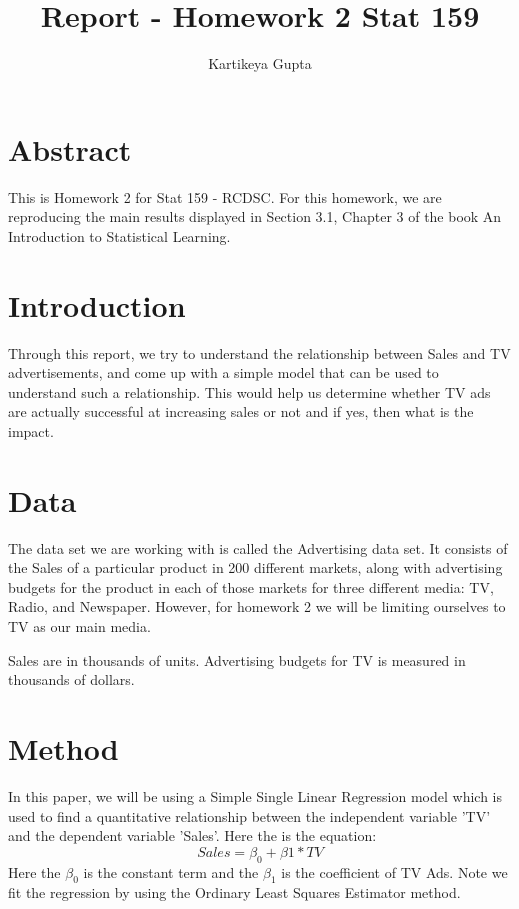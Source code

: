 \documentclass{article}
\begin{document}

\title{Report - Homework 2 Stat 159}
\author{Kartikeya Gupta}
\maketitle

\section{Abstract}
This is Homework 2 for Stat 159 - RCDSC. For this homework, we are reproducing the main results displayed in Section 3.1, Chapter 3 of the book An Introduction to Statistical Learning.  


\section{Introduction}
Through this report, we try to understand the relationship between Sales and TV advertisements, and come up with a simple model that can be used to understand such a relationship. This would help us determine whether TV ads are actually successful at increasing sales or not and if yes, then what is the impact. 


\section{Data}
The data set we are working with is called the Advertising data set. It consists of the Sales of a particular product in 200 different markets, along with advertising budgets for the product in each of those markets for three different media: TV, Radio, and Newspaper. However, for homework 2 we will be limiting ourselves to TV as our main media. 

Sales are in thousands of units.  
Advertising budgets for TV is measured in thousands of dollars.  


\section{Method}
In this paper, we will be using a Simple Single Linear Regression model which is used to find a quantitative relationship between the independent variable 'TV' and the dependent variable 'Sales'. Here the is the equation:
\begin{equation}
Sales = \beta_0 + \beta1 * TV
\end{equation}
Here the $\beta_0$ is the constant term and the $\beta_1$ is the coefficient of TV Ads.
Note we fit the regression by using the Ordinary Least Squares Estimator method.
\end{document}
